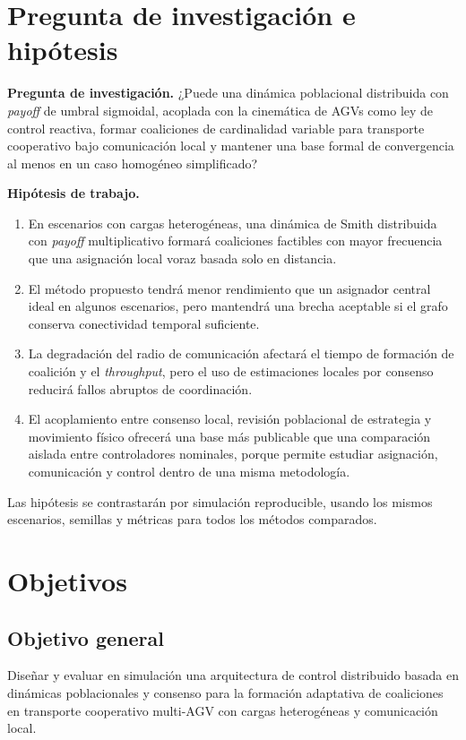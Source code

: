 \documentclass[11pt,a4paper]{article}
\begin{document}
\section{Pregunta de investigación e hipótesis}

\textbf{Pregunta de investigación.} ¿Puede una dinámica poblacional distribuida con \textit{payoff} de umbral sigmoidal, acoplada con la cinemática de AGVs como ley de control reactiva, formar coaliciones de cardinalidad variable para transporte cooperativo bajo comunicación local y mantener una base formal de convergencia al menos en un caso homogéneo simplificado?

\textbf{Hipótesis de trabajo.}
\begin{enumerate}
  \item En escenarios con cargas heterogéneas, una dinámica de Smith distribuida con \textit{payoff} multiplicativo formará coaliciones factibles con mayor frecuencia que una asignación local voraz basada solo en distancia.
  \item El método propuesto tendrá menor rendimiento que un asignador central ideal en algunos escenarios, pero mantendrá una brecha aceptable si el grafo conserva conectividad temporal suficiente.
  \item La degradación del radio de comunicación afectará el tiempo de formación de coalición y el \textit{throughput}, pero el uso de estimaciones locales por consenso reducirá fallos abruptos de coordinación.
  \item El acoplamiento entre consenso local, revisión poblacional de estrategia y movimiento físico ofrecerá una base más publicable que una comparación aislada entre controladores nominales, porque permite estudiar asignación, comunicación y control dentro de una misma metodología.
\end{enumerate}

Las hipótesis se contrastarán por simulación reproducible, usando los mismos escenarios, semillas y métricas para todos los métodos comparados.

\section{Objetivos}

\subsection{Objetivo general}

Diseñar y evaluar en simulación una arquitectura de control distribuido basada en dinámicas poblacionales y consenso para la formación adaptativa de coaliciones en transporte cooperativo multi-AGV con cargas heterogéneas y comunicación local.
\end{document}
